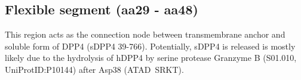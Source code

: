 \subsection{Flexible segment (aa29 - aa48)}

This region acts as the connection node between transmembrane anchor and soluble form of DPP4 (sDPP4 39-766). Potentially, sDPP4 is released is mostly likely due to the hydrolysis of hDPP4 by serine protease Granzyme B (S01.010, UniProtID:P10144) after Asp38 (ATAD~\textbar SRKT).~\cite{Song_2018} 
